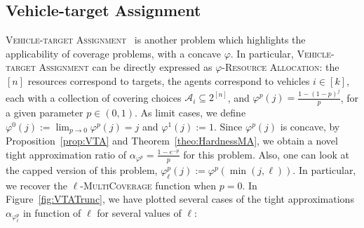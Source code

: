 \subsection{Vehicle-target Assignment}
\label{subsection:vehicle-target}
\textsc{Vehicle-target Assignment}~\cite{Murphey00,PM19} is another problem which highlights the applicability of coverage problems, with a concave $\varphi$. In particular, \textsc{Vehicle-target Assignment} can be directly expressed as $\varphi$-\textsc{Resource Allocation}: the $[n]$ resources correspond to targets, the agents correspond to vehicles $i \in [k]$, each  with a collection of covering choices $\mathcal{A}_i \subseteq 2^{[n]}$, and $\varphi^p(j) = \frac{1-(1-p)^j}{p}$, for a given parameter $p \in (0,1)$. As limit cases, we define $\varphi^0(j) := \lim_{p \rightarrow 0} \varphi^p(j) = j$ and $\varphi^1(j) := 1$. Since $\varphi^p(j)$ is concave, by Proposition~\ref{prop:VTA} and Theorem~\ref{theo:HardnessMA}, we obtain a novel tight approximation ratio of $\alpha_{\varphi^p} = \frac{1 - e^{-p}}{p}$ for this problem. Also, one can look at the capped version of this problem, $\varphi^p_{\ell}(j) := \varphi^p(\min(j,\ell))$. In particular, we recover the $\ell$-\textsc{MultiCoverage} function when $p=0$. In Figure~\ref{fig:VTATrunc}, we have plotted several cases of the tight approximations $\alpha_{\varphi^p_{\ell}}$ in function of $\ell$ for several values of $\ell$:

